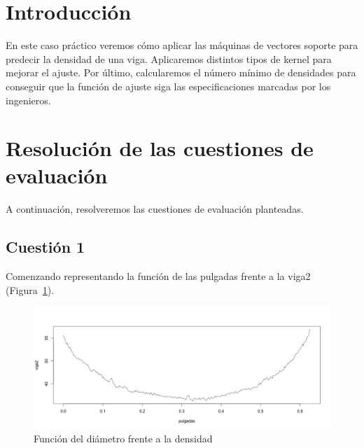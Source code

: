 \documentclass[12pt,a4paper,twoside,openright,titlepage,final]{article}
\author{José Ignacio Escribano}
\title{}
\begin{document}
\setcounter{page}{1}


\listoffigures
\thispagestyle{empty}
\newpage

\tableofcontents
\thispagestyle{empty}
\newpage


\setcounter{page}{1}

\section{Introducción}

En este caso práctico veremos cómo aplicar las máquinas de vectores soporte para predecir la densidad de una viga. Aplicaremos distintos tipos de kernel para mejorar el ajuste. Por último, calcularemos el número mínimo de densidades para conseguir que la función de ajuste siga las especificaciones marcadas por los ingenieros. 

\section{Resolución de las cuestiones de evaluación}

A continuación, resolveremos las cuestiones de evaluación planteadas.

\subsection{Cuestión 1}

Comenzando representando la función de las pulgadas frente a la viga2 (Figura~\ref{fig:plot_viga2_inicial}).\\

\begin{figure}
\centering
\includegraphics[width=0.8\linewidth]{imagenes/plot_viga2_inicial}
\caption{Función del diámetro frente a la densidad}
\label{fig:plot_viga2_inicial}
\end{figure}
\end{document}
